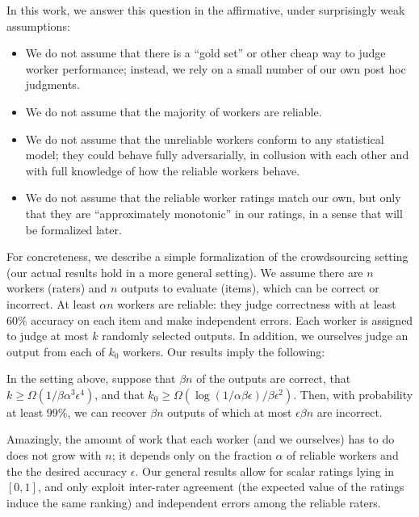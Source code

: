 In this work, we answer this question in the affirmative, under surprisingly 
weak assumptions:
\begin{itemize}
\item We do not assume that there is a ``gold set'' or other cheap way to judge 
      worker performance; instead, we rely on a small number of our own post hoc judgments.
\item We do not assume that the majority of workers are reliable.
\item We do not assume that the unreliable workers conform to any statistical 
      model; they could behave fully adversarially, in collusion with each other 
      and with full knowledge of how the reliable workers behave.
\item We do not assume that the reliable worker ratings match our own, but only that they are 
      ``approximately monotonic'' in our ratings, in a sense that will be 
      formalized later.
\end{itemize}
For concreteness, we describe a simple formalization of the crowdsourcing 
setting (our actual results hold in a more general setting). We assume 
there are $n$ workers (raters) and $n$ outputs to evaluate (items), which can
be correct or incorrect. At least $\alpha n$ workers are reliable:
they judge correctness with at least $60\%$ accuracy on each item 
and make independent errors. Each worker is assigned to judge at most $k$ randomly selected 
outputs. In 
addition, we ourselves judge an output from each of $k_0$ workers. Our results 
imply the following:



\begin{theorem}
\label{thm:intro}
In the setting above, suppose that $\beta n$ of the outputs are correct, that 
$k \geq \Omega(1/\beta\alpha^3\epsilon^4)$, and that 
$k_0 \geq \Omega(\log(1/\alpha\beta\epsilon)/\beta\epsilon^2)$. Then, with probability 
at least $99\%$, we can recover $\beta n$ outputs of which at most $\epsilon\beta n$ 
are incorrect.
\end{theorem}
Amazingly, the amount of work that each worker (and we ourselves) has 
to do does not grow with $n$; it depends only on the fraction $\alpha$ of 
reliable workers and the the desired accuracy $\epsilon$.
Our general results allow for scalar ratings lying in $[0,1]$, and only 
exploit inter-rater agreement (the expected value of the ratings induce 
the same ranking) and independent errors among the reliable raters.

